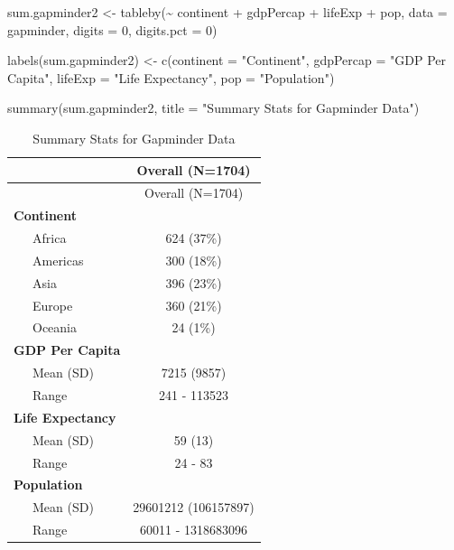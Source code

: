 \documentclass[
]{book}
\makeatletter
\newenvironment{Shaded}{\begin{snugshade}}{\end{snugshade}}
\newcommand{\AttributeTok}[1]{\textcolor[rgb]{0.61,0.61,0.61}{#1}}
\newcommand{\DecValTok}[1]{\textcolor[rgb]{0.06,0.06,0.06}{#1}}
\newcommand{\FunctionTok}[1]{\textcolor[rgb]{0,0,0}{#1}}
\newcommand{\NormalTok}[1]{#1}
\newcommand{\OtherTok}[1]{\textcolor[rgb]{0.37,0.37,0.37}{#1}}
\newcommand{\SpecialCharTok}[1]{\textcolor[rgb]{0,0,0}{#1}}
\newcommand{\StringTok}[1]{\textcolor[rgb]{0.5,0.5,0.5}{#1}}
\newenvironment{kframe}{%
\medskip{}
\setlength{\fboxsep}{.8em}
 \def\at@end@of@kframe{}%
 \ifinner\ifhmode%
  \def\at@end@of@kframe{\end{minipage}}%
  \begin{minipage}{\columnwidth}%
 \fi\fi%
 \def\FrameCommand##1{\hskip\@totalleftmargin \hskip-\fboxsep
 \colorbox{shadecolor}{##1}\hskip-\fboxsep
     \hskip-\linewidth \hskip-\@totalleftmargin \hskip\columnwidth}%
 \MakeFramed {\advance\hsize-\width
   \@totalleftmargin\z@ \linewidth\hsize
   \@setminipage}}%
 {\par\unskip\endMakeFramed%
 \at@end@of@kframe}
\renewenvironment{Shaded}{\begin{kframe}}{\end{kframe}}
\makeatother
\begin{document}
\begin{Shaded}
\begin{Highlighting}[]
\NormalTok{sum.gapminder2 }\OtherTok{\textless{}{-}} \FunctionTok{tableby}\NormalTok{(}\SpecialCharTok{\textasciitilde{}}\NormalTok{ continent }\SpecialCharTok{+}\NormalTok{ gdpPercap }\SpecialCharTok{+}\NormalTok{ lifeExp }\SpecialCharTok{+}\NormalTok{ pop, }\AttributeTok{data =}\NormalTok{ gapminder, }\AttributeTok{digits =} \DecValTok{0}\NormalTok{, }\AttributeTok{digits.pct =} \DecValTok{0}\NormalTok{)}

\FunctionTok{labels}\NormalTok{(sum.gapminder2) }\OtherTok{\textless{}{-}} \FunctionTok{c}\NormalTok{(}\AttributeTok{continent =} \StringTok{"Continent"}\NormalTok{, }\AttributeTok{gdpPercap =} \StringTok{"GDP Per Capita"}\NormalTok{, }\AttributeTok{lifeExp =} \StringTok{"Life Expectancy"}\NormalTok{, }\AttributeTok{pop =} \StringTok{"Population"}\NormalTok{)}
\end{Highlighting}
\end{Shaded}

\begin{Shaded}
\begin{Highlighting}[]
\FunctionTok{summary}\NormalTok{(sum.gapminder2, }\AttributeTok{title =} \StringTok{"Summary Stats for Gapminder Data"}\NormalTok{)}
\end{Highlighting}
\end{Shaded}

\begin{longtable}[]{@{}lc@{}}
\caption{Summary Stats for Gapminder Data}\tabularnewline
\toprule
& Overall (N=1704) \\
\midrule
\endfirsthead
\toprule
& Overall (N=1704) \\
\midrule
\endhead
\textbf{Continent} & \\
~~~Africa & 624 (37\%) \\
~~~Americas & 300 (18\%) \\
~~~Asia & 396 (23\%) \\
~~~Europe & 360 (21\%) \\
~~~Oceania & 24 (1\%) \\
\textbf{GDP Per Capita} & \\
~~~Mean (SD) & 7215 (9857) \\
~~~Range & 241 - 113523 \\
\textbf{Life Expectancy} & \\
~~~Mean (SD) & 59 (13) \\
~~~Range & 24 - 83 \\
\textbf{Population} & \\
~~~Mean (SD) & 29601212 (106157897) \\
~~~Range & 60011 - 1318683096 \\
\bottomrule
\end{longtable}
\end{document}
